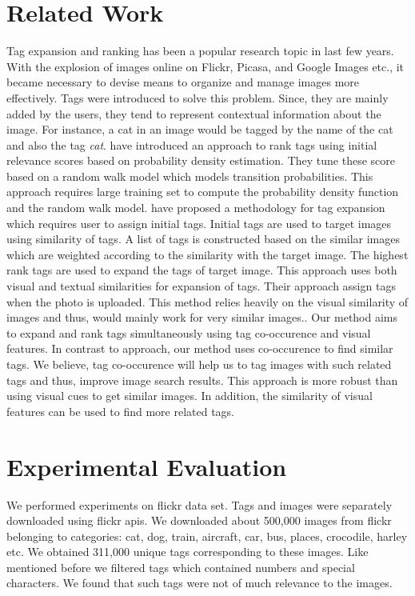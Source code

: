 \documentclass[12pt]{article}
\begin{document}
\section{Related Work}
Tag expansion and ranking has been a popular research topic in last few years. With the explosion of
images online on Flickr, Picasa, and Google Images etc., it became necessary to devise means to
organize and manage images more effectively. Tags were introduced to solve this problem. Since,
they are mainly added by the users, they tend to represent contextual information about the image.
For instance, a cat in an image would be tagged by the name of the cat and also the tag \emph{cat}.
 have introduced an approach to rank tags using initial relevance 
scores based on probability density estimation. They tune these score based on a random walk model
which models transition probabilities. This approach requires large training set to compute the 
probability density function and the random walk model.  have 
proposed a methodology for tag expansion which requires user to assign initial tags. Initial tags
are used to target images using similarity of tags. A list of tags is constructed based on the similar images
which are weighted according to the similarity with the target image. The highest rank tags are used to 
expand the tags of target image. This approach uses both visual and textual similarities for expansion of tags.
Their approach assign tags when the photo is uploaded. This method relies heavily on the visual similarity
of images and thus, would mainly work for very similar images.. Our method aims to expand and rank tags simultaneously
using tag co-occurence and visual features. In contrast to  approach, 
our method uses co-occurence to find similar tags. We believe, tag co-occurence will help us to tag images with
such related tags and thus, improve image search results. This approach is more robust than using visual cues to
get similar images. In addition, the similarity of visual features can be used to find more related tags.

\section{Experimental Evaluation}
We performed experiments on flickr data set. Tags and images were separately downloaded using
flickr apis. We downloaded about 500,000 images from flickr belonging to categories: cat,
dog, train, aircraft, car, bus, places, crocodile, harley etc. We obtained 311,000 unique tags
corresponding to these images. Like mentioned before we filtered tags which contained numbers
and special characters. We found that such tags were not of much relevance to the images.
\end{document}
